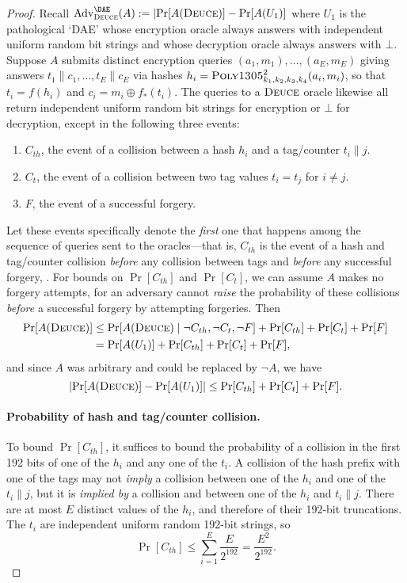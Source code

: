 \documentclass[draft]{article}
\DeclareRobustCommand{\operatorsc}[1]{{%
  \ifmmode\let\next=\operatorname\else\let\next=\relax\fi\next{\textsc{#1}}}}
\def\Poly#1/{\operatorsc{Poly#1}}
\def\Deuce/{\operatorsc{Deuce}}
\DeclareMathOperator{\Adv}{Adv}
\newcommand{\concat}{\mathbin\|}
\newcommand{\given}{\mathrel|}
\begin{document}
\begin{proof}

Recall
 $\Adv^{\DAE}_{\Deuce/}(A) := \lvert\Pr[A(\Deuce/)] - \Pr[A(U_1)]$
 where $U_1$ is the pathological `DAE' whose encryption oracle always
 answers with independent uniform random bit strings and whose
 decryption oracle always answers with $\bot$.
Suppose $A$ submits distinct encryption queries
 $(a_1, m_1), \dotsc, (a_E, m_E)$
 giving answers
 $t_1 \concat c_1, \dotsc, t_E \concat c_E$
 via hashes
 $h_i = \Poly1305/^2_{k_1,k_2,k_3,k_4}(a_i, m_i)$,
 so that
 $t_i = f(h_i)$
 and
 $c_i = m_i \oplus f_*(t_i)$.
The queries to a $\Deuce/$ oracle likewise all return independent
 uniform random bit strings for encryption or $\bot$ for decryption,
 except in the following three events:
%
\begin{enumerate}
  \item
    $C_{th}$, the event of a collision between a hash $h_i$ and a
     tag/counter $t_i \concat j$.
  \item
    $C_t$, the event of a collision between two tag values $t_i = t_j$
     for $i \ne j$.
  \item
    $F$, the event of a successful forgery.
\end{enumerate}
%
Let these events specifically denote the \emph{first} one that
 happens among the sequence of queries sent to the oracles---that is,
 $C_{th}$ is the event of a hash and tag/counter collision
 \emph{before} any collision between tags and \emph{before} any
 successful forgery, \etc.
For bounds on $\Pr[C_{th}]$ and $\Pr[C_t]$, we can assume $A$ makes no
 forgery attempts, for an adversary cannot \emph{raise} the probability
 of these collisions \emph{before} a successful forgery by attempting
 forgeries.
Then
%
\begin{align*}
  \Pr[A(\Deuce/)]
  &\leq \Pr[A(\Deuce/) \given \lnot C_{th}, \lnot C_t, \lnot F]
     + \Pr[C_{th}] + \Pr[C_t] + \Pr[F] \\
  &= \Pr[A(U_1)] + \Pr[C_{th}] + \Pr[C_t] + \Pr[F],
\end{align*}
%
 and since $A$ was arbitrary and could be replaced by $\lnot A$, we
 have
\[
  \lvert\Pr[A(\Deuce/)] - \Pr[A(U_1)]\rvert
  \leq \Pr[C_{th}] + \Pr[C_t] + \Pr[F].
\]

\paragraph*{Probability of hash and tag/counter collision.}
To bound $\Pr[C_{th}]$, it suffices to bound the probability of a
 collision in the first 192 bits of one of the $h_i$ and any one of the
 $t_i$.
A collision of the hash prefix with one of the tags may not
 \emph{imply} a collision between one of the $h_i$ and one of the $t_i
 \concat j$, but it is \emph{implied by} a collision and between one of
 the $h_i$ and $t_i \concat j$.
There are at most $E$ distinct values of the $h_i$, and therefore of
 their 192-bit truncations.
The $t_i$ are independent uniform random 192-bit strings, so
%
\[
  \Pr[C_{th}]
  \leq \sum_{i=1}^E \frac{E}{2^{192}}
  = \frac{E^2}{2^{192}}.
\]


\end{proof}
\end{document}
